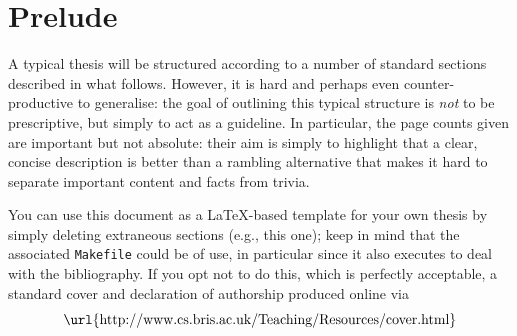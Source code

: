 \documentclass[ %
                    author={Luke Murray},
                supervisor={Dr. Simon Hollis},
                     title={Shadow Peer-to-Peer Networks},
                  subtitle={},
                    degree={MEng},
                      year={2013} ]{thesis}
\begin{document}


\section*{Prelude}
\thispagestyle{empty}

A typical thesis will be structured according to a number of standard 
sections described in what follows.  However, it is hard and perhaps
even counter-productive to generalise: the goal of outlining this 
typical structure is {\em not} to be prescriptive, but simply to act 
as a guideline.  In particular, the page counts given are important 
but not absolute: their aim is simply to highlight that a clear, 
concise description is better than a rambling alternative that 
makes it hard to separate important content and facts from trivia.

You can use this document as a \LaTeX-based
template for your own thesis by simply deleting extraneous sections (e.g., 
this one); keep in mind that the associated {\tt Makefile} could be of
use, in particular since it also executes \mbox{\BibTeX} to deal with the
bibliography.  If you opt not to do this, which is perfectly acceptable,
a standard cover and declaration of authorship produced online via
\[
\mbox{\url{http://www.cs.bris.ac.uk/Teaching/Resources/cover.html}}
\]



\maketitle


\frontmatter
\end{document}
